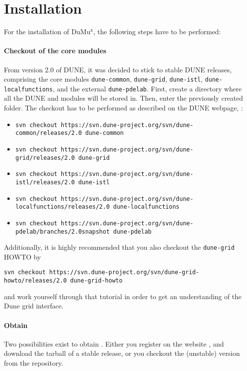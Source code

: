 \section{Installation} 
\label{install}

For the installation of DuMu$^\text{x}$, the following steps have to be performed:  

\paragraph{Checkout of the core modules}
From version 2.0 of DUNE, it was decided to stick to stable DUNE releases, comprising the core modules 
\texttt{dune-common}, \texttt{dune-grid}, \texttt{dune-istl}, \texttt{dune-localfunctions}, and the external \texttt{dune-pdelab}.  
First, create a directory where all the DUNE and \Dumux modules will be stored in. Then, enter the previously created folder. 
The checkout has to be performed as described on 
the DUNE webpage, \cite{DUNE-HP}: 
\begin{itemize}
\item \texttt{svn checkout https://svn.dune-project.org/svn/dune-common/releases/2.0 dune-common}
\item \texttt{svn checkout https://svn.dune-project.org/svn/dune-grid/releases/2.0 dune-grid}
\item \texttt{svn checkout https://svn.dune-project.org/svn/dune-istl/releases/2.0 dune-istl}
\item \texttt{svn checkout https://svn.dune-project.org/svn/dune-localfunctions/releases/2.0 dune-localfunctions}
\item \texttt{svn checkout https://svn.dune-project.org/svn/dune-pdelab/branches/2.0snapshot dune-pdelab}
\end{itemize} 

Additionally, it is highly recommended that you also checkout the \texttt{dune-grid} HOWTO 
by 
\begin{center}
\texttt{svn checkout https://svn.dune-project.org/svn/dune-grid-howto/releases/2.0 dune-grid-howto}
\end{center}
and work yourself through that tutorial in order to get an understanding of the Dune grid interface. 

\paragraph{Obtain \Dumux}
Two possibilities exist to obtain \Dumux. Either you register on the \Dumux website \cite{dumux-hp}, and download the tarball of a stable release, or 
you checkout the (unstable) version from the \Dumux repository.

